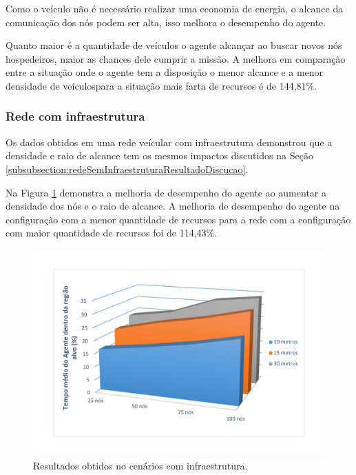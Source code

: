Como o veículo não é necessário realizar uma economia de energia, o alcance da comunicação dos nós podem ser alta, isso melhora o desempenho do agente. 

Quanto maior é a quantidade de veículos o agente alcançar ao buscar novos nós hospedeiros, maior as chances dele cumprir a missão. A melhora em comparação entre a situação onde o agente tem a disposição o menor alcance e a menor densidade de veículospara a situação mais farta de recursos é de 144,81\%.   


\subsubsection{Rede com infraestrutura}

	Os dados obtidos em uma rede veícular com infraestrutura demonstrou que a densidade e raio de alcance tem os mesmos impactos discutidos na Seção 
	\ref{subsubsection:redeSemInfraestruturaResultadoDiscucao}.

	Na Figura \ref{fig:graficosComTorres} demonstra a melhoria de desempenho do agente ao aumentar a densidade dos nós e o raio de alcance. A melhoria de desempenho do agente na configuração com a menor quantidade de recursos para a rede com a configuração com maior quantidade de recursos foi de 114,43\%.   
 

	\begin{figure}[htbp]
		\centering
		\includegraphics[scale=0.34]{resultados/graficos/graficoComTorres.pdf}
		\caption{Resultados obtidos no cenários com infraestrutura.}
		\label{fig:graficosComTorres}
	\end{figure}

